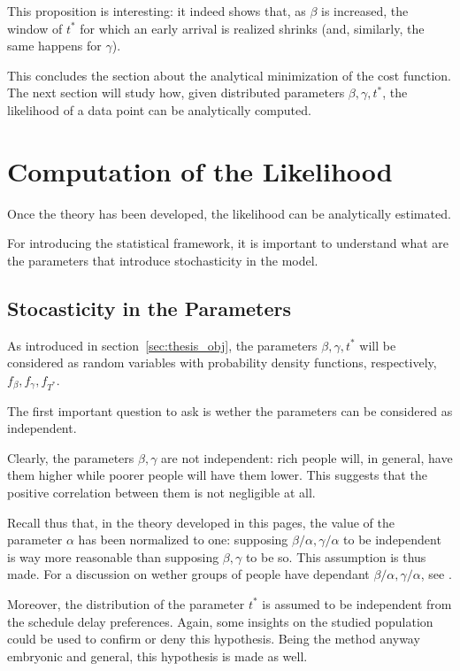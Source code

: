 This proposition is interesting:
it indeed shows that, as \(\beta\) is increased,
the window of \(t^*\) for which an early arrival is realized shrinks (and, similarly, the same happens for \(\gamma\)).

This concludes the section about the analytical minimization of the cost function.
The next section will study how, given distributed parameters \(\beta, \gamma, t^*\),
the likelihood of a data point can be analytically computed.

\section{Computation of the Likelihood}
\label{sec:lik}

Once the theory has been developed,
the likelihood can be analytically estimated.

For introducing the statistical framework,
it is important to understand what are the parameters that introduce stochasticity in the model.

\subsection{Stocasticity in the Parameters}

As introduced in section~\ref{sec:thesis_obj}, the parameters \(\beta, \gamma, t^*\) will be considered as random variables
with probability density functions, respectively, \(f_\beta, f_\gamma, f_{T^*}\).

The first important question to ask is wether the parameters can be considered as independent.

Clearly, the parameters \(\beta, \gamma\) are not independent:
rich people will, in general, have them higher while poorer people will have them lower.
This suggests that the positive correlation between them is not negligible at all.

Recall thus that, in the theory developed in this pages,
the value of the parameter \(\alpha\) has been normalized to one:
supposing \(\beta/\alpha, \gamma/\alpha\) to be independent is way more reasonable than supposing \(\beta, \gamma\) to be so.
This assumption is thus made. For a discussion on wether groups of people have dependant \(\beta/\alpha, \gamma/\alpha\), see \cite{LindseyBook}.

Moreover, the distribution of the parameter \(t^*\) is assumed to be independent from the schedule delay preferences.
Again, some insights on the studied population could be used to confirm or deny this hypothesis.
Being the method anyway embryonic and general, this hypothesis is made as well.

